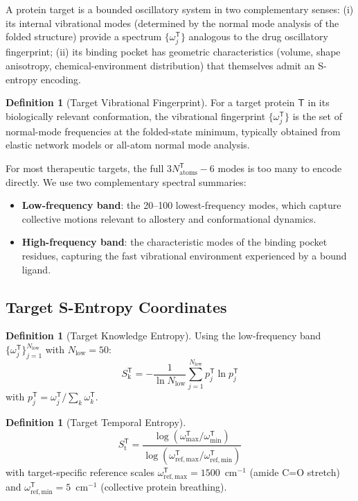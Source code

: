 \documentclass[11pt,twocolumn,a4paper]{article}
\theoremstyle{definition}
\newtheorem{definition}[theorem]{Definition}
\theoremstyle{remark}
\newcommand{\Sk}{S_{\mathrm{k}}}
\newcommand{\St}{S_{\mathrm{t}}}
\newcommand{\Target}{\mathsf{T}}
\begin{document}
A protein target is a bounded oscillatory system in two complementary senses: (i) its internal vibrational modes (determined by the normal mode analysis of the folded structure) provide a spectrum $\{\omega_j^\Target\}$ analogous to the drug oscillatory fingerprint; (ii) its binding pocket has geometric characteristics (volume, shape anisotropy, chemical-environment distribution) that themselves admit an S-entropy encoding.

\begin{definition}[Target Vibrational Fingerprint]
\label{def:target_vib}
For a target protein $\Target$ in its biologically relevant conformation, the vibrational fingerprint $\{\omega_j^\Target\}$ is the set of normal-mode frequencies at the folded-state minimum, typically obtained from elastic network models \citep{bahar2010} or all-atom normal mode analysis.
\end{definition}

For most therapeutic targets, the full $3N_{\mathrm{atoms}}^\Target - 6$ modes is too many to encode directly. We use two complementary spectral summaries:

\begin{itemize}[nosep,leftmargin=*]
\item \textbf{Low-frequency band}: the 20--100 lowest-frequency modes, which capture collective motions relevant to allostery and conformational dynamics.
\item \textbf{High-frequency band}: the characteristic modes of the binding pocket residues, capturing the fast vibrational environment experienced by a bound ligand.
\end{itemize}

\subsection{Target S-Entropy Coordinates}

\begin{definition}[Target Knowledge Entropy]
\label{def:target_sk}
Using the low-frequency band $\{\omega_j^\Target\}_{j=1}^{N_{\mathrm{low}}}$ with $N_{\mathrm{low}} = 50$:
\begin{equation}
\Sk^\Target = -\frac{1}{\ln N_{\mathrm{low}}} \sum_{j=1}^{N_{\mathrm{low}}} p_j^\Target \ln p_j^\Target
\end{equation}
with $p_j^\Target = \omega_j^\Target / \sum_k \omega_k^\Target$.
\end{definition}

\begin{definition}[Target Temporal Entropy]
\label{def:target_st}
\begin{equation}
\St^\Target = \frac{\log(\omega_{\max}^\Target/\omega_{\min}^\Target)}{\log(\omega_{\mathrm{ref,max}}^\Target/\omega_{\mathrm{ref,min}}^\Target)}
\end{equation}
with target-specific reference scales $\omega_{\mathrm{ref,max}}^\Target = 1500$~cm$^{-1}$ (amide C=O stretch) and $\omega_{\mathrm{ref,min}}^\Target = 5$~cm$^{-1}$ (collective protein breathing).
\end{definition}
\end{document}
